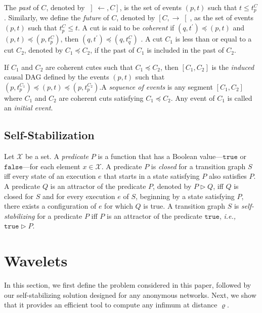 \documentclass[11pt]{article}
\newcommand{\mX}   {\mathcal{X}}
\newcommand{\TRUE}{\mathtt{true}}
\newcommand{\FALSE}{\mathtt{false}}
\newcommand{\ie}{\emph{i.e., }}
\begin{document}
The \emph{past} of $C$, denoted by $\left]\leftarrow ,C\right]$, is the set of events 
$(p,t)$ such that $t\leq t_{p}^{C}$. 
Similarly, we define the \emph{future} of $C$, denoted by $\left[ C,\rightarrow \right[$, as the set of 
events $(p,t)$ such that $t_{p}^{C}\leq t$. 
A cut is said to be \emph{coherent} if $\left( q,t^{\prime }\right) \preceq \left(
p,t\right) $ and $\left( p,t\right) \preceq \left( p,t_{p}^{C}\right)$,
then $\left( q,t^{\prime }\right) \preceq \left( q,t_{q}^{C}\right)$ .
A cut $C_{1}$ is less than or equal to a cut $C_{2}$, denoted by $C_{1}\preceq C_{2}$,
if the past of $C_{1}$ is included in the past of $C_{2}.$

If $C_{1}$ and $C_{2}$ are coherent cutes such that $C_{1}\preceq C_{2}$, then $\left[ C_{1},C_{2}\right] $ is the 
\emph{induced} causal DAG defined by the events $\left( p,t\right) $ such
that $\left( p,t_{p}^{C_{1}}\right) \preceq \left( p,t\right) \preceq \left(
p,t_{p}^{C_{2}}\right) $.A \emph{sequence of events} is any segment $\left[ C_{1},C_{2}\right] $
where $C_{1}$ and $C_{2}$ are coherent cuts satisfying $C_{1}\preceq C_{2}$.  
Any event of $C_1$ is called an \emph{initial event}.

\subsection{Self-Stabilization}
Let $\mX$ be a set. A \emph{predicate} $P$ is a function that has a Boolean 
value---$\TRUE$ or $\FALSE$---for each element $x\in \mX$.
A predicate $P$ is \emph{closed} for a transition graph $S$ iff 
every state of an execution $e$ that starts in a state satisfying $P$ also satisfies $P$.
A predicate $Q$ is an attractor of the predicate $P$, denoted by $P \vartriangleright Q$,
iff $Q$ is closed for $S$ and for every execution $e$ of $S$, beginning by a state satisfying $P$, 
there exists a configuration of $e$ for which $Q$ is true. 
A transition graph $S$ is \emph{self-stabilizing} for a predicate $P$ iff $P$ is an attractor 
of the predicate $\TRUE$, \ie $\TRUE \vartriangleright P$.



\section{Wavelets}
\label{sec:wave}

In this section, we first define the problem considered in this paper, followed 
by our self-stabilizing solution designed for any anonymous networks. Next, we show that 
it provides an efficient tool to compute any infimum at distance $\varrho$. 
\end{document}
